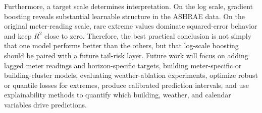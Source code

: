 \documentclass[conference]{IEEEtran}
\begin{document}
Furthermore, a target scale determines interpretation. On the log scale, gradient boosting reveals substantial learnable structure in the ASHRAE data. On the original meter-reading scale, rare extreme values dominate squared-error behavior and keep $R^2$ close to zero. Therefore, the best practical conclusion is not simply that one model performs better than the others, but that log-scale boosting should be paired with a future tail-risk layer. Future work will focus on adding lagged meter readings and horizon-specific targets, building meter-specific or building-cluster models, evaluating weather-ablation experiments, optimize robust or quantile losses for extremes, produce calibrated prediction intervals, and use explainability methods to quantify which building, weather, and calendar variables drive predictions.












\end{document}

